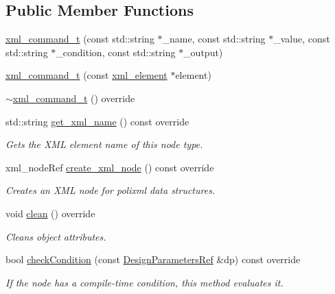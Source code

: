 \subsection*{Public Member Functions}
\begin{DoxyCompactItemize}
\item 
\hyperlink{classxml__command__t_a32deca33f9e23706f5e59a54d3c3d4df}{xml\+\_\+command\+\_\+t} (const std\+::string $\ast$\+\_\+name, const std\+::string $\ast$\+\_\+value, const std\+::string $\ast$\+\_\+condition, const std\+::string $\ast$\+\_\+output)
\item 
\hyperlink{classxml__command__t_a9c8e18a3d1c0a2cd274c2a0d2ba6cab5}{xml\+\_\+command\+\_\+t} (const \hyperlink{classxml__element}{xml\+\_\+element} $\ast$element)
\item 
\hyperlink{classxml__command__t_a6eedad9e30d94e00147910ac0df8e9d8}{$\sim$xml\+\_\+command\+\_\+t} () override
\item 
std\+::string \hyperlink{classxml__command__t_a5d5ebe5a97c62b313c7190bb084fba87}{get\+\_\+xml\+\_\+name} () const override
\begin{DoxyCompactList}\small\item\em Gets the X\+ML element name of this node type. \end{DoxyCompactList}\item 
xml\+\_\+node\+Ref \hyperlink{classxml__command__t_a8b11fb3c538442d1717e06a8f448b9ee}{create\+\_\+xml\+\_\+node} () const override
\begin{DoxyCompactList}\small\item\em Creates an X\+ML node for polixml data structures. \end{DoxyCompactList}\item 
void \hyperlink{classxml__command__t_ace4f9e713601beb9a850d2459550789f}{clean} () override
\begin{DoxyCompactList}\small\item\em Cleans object attributes. \end{DoxyCompactList}\item 
bool \hyperlink{classxml__command__t_a0bd9c4cf582f671898afd9ec1602a1dd}{check\+Condition} (const \hyperlink{DesignParameters_8hpp_ae36bb1c4c9150d0eeecfe1f96f42d157}{Design\+Parameters\+Ref} \&dp) const override
\begin{DoxyCompactList}\small\item\em If the node has a compile-\/time condition, this method evaluates it. \end{DoxyCompactList}\end{DoxyCompactItemize}
